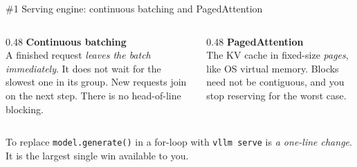\documentclass[aspectratio=169,10pt]{beamer}
\newcommand{\llmbase}{%
  \node[llmbox] (PF) at (0, 0) {Prefill};
  \node[llmbox] (KV) at (1.05, 0) {KV};
  \node[llmbox] (DC) at (1.95, 0) {Decode};
  \node[llmbox] (WP) at (0, -0.45) {Weights};
  \node[llmbox] (WD) at (1.95, -0.45) {Weights};
  \draw[llmar] (PF)--(KV); \draw[llmar] (KV)--(DC);
  \draw[llmar] (WP)--(PF); \draw[llmar] (WD)--(DC);
}
\newcommand{\llmoverlay}[1]{}  %
\newcommand{\llmdiagS}{\llmoverlay{\begin{tikzpicture}[scale=0.65]\llmbase
  \node[llmbox, llmhl] at (0,0) {Prefill};
  \node[llmbox, llmhl] at (1.95,0) {Decode};\end{tikzpicture}}}
\begin{document}
\begin{frame}{\#1 Serving engine: continuous batching and PagedAttention}
  \llmdiagS
  \begin{columns}[T]
    \begin{column}{0.48\textwidth}
      \textbf{Continuous batching}\\[0.3em]
      \small A finished request \emph{leaves the batch immediately}. It does
      not wait for the slowest one in its group. New requests join on the
      next step. There is no head-of-line blocking.
    \end{column}
    \begin{column}{0.48\textwidth}
      \textbf{PagedAttention}\\[0.3em]
      \small The KV cache in fixed-size \emph{pages}, like OS virtual memory.
      Blocks need not be contiguous, and you stop reserving for the worst
      case.
    \end{column}
  \end{columns}
  \vspace{1.2em}
  \begin{center}
    \begin{minipage}{0.88\textwidth}
      \begin{alertblock}{}
        \centering
        To replace \texttt{model.generate()} in a for-loop with
        \texttt{vllm serve} is \emph{a one-line change}. It is the
        largest single win available to you.
      \end{alertblock}
    \end{minipage}
  \end{center}
\end{frame}
\end{document}
